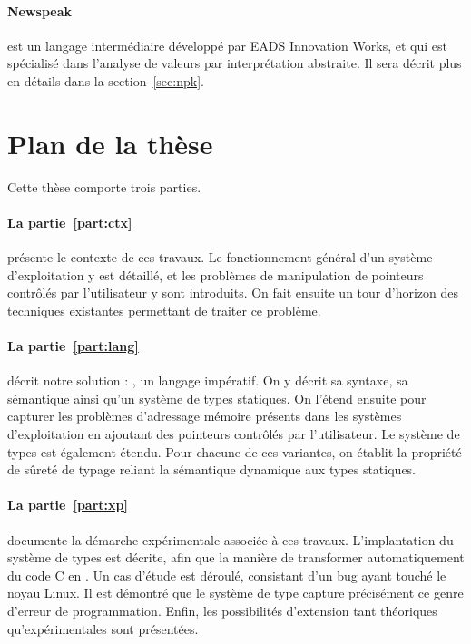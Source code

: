 \paragraph{Newspeak}\cite{newspeak} est un langage intermédiaire développé par
EADS Innovation Works, et qui est spécialisé dans l'analyse de valeurs par
interprétation abstraite. Il sera décrit plus en détails dans la
section~\ref{sec:npk}.

\section{Plan de la thèse}

Cette thèse comporte trois parties.

\paragraph{La partie~\ref{part:ctx}} présente le contexte de ces travaux. Le
fonctionnement général d'un système d'exploitation y est détaillé, et les
problèmes de manipulation de pointeurs contrôlés par l'utilisateur y sont
introduits. On fait ensuite un tour d'horizon des techniques existantes
permettant de traiter ce problème.


\paragraph{La partie~\ref{part:lang}} décrit notre solution : \langname, un
langage impératif. On y décrit sa syntaxe, sa sémantique ainsi qu'un système de
types statiques. On l'étend ensuite pour capturer les problèmes d'adressage
mémoire présents dans les systèmes d'exploitation en ajoutant des pointeurs
contrôlés par l'utilisateur. Le système de types est également étendu. Pour
chacune de ces variantes, on établit la propriété de sûreté de typage reliant la
sémantique dynamique aux types statiques.


\paragraph{La partie~\ref{part:xp}} documente la démarche expérimentale associée
à ces travaux. L'implantation du système de types est décrite, afin que la
manière de transformer automatiquement du code C en \langname. Un cas d'étude
est déroulé, consistant d'un bug ayant touché le noyau Linux. Il est démontré
que le système de type capture précisément ce genre d'erreur de programmation.
Enfin, les possibilités d'extension tant théoriques qu'expérimentales sont
présentées.




